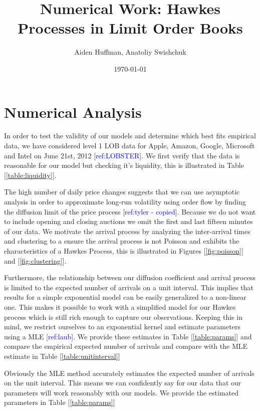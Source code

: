 \documentclass{article}
\title{Numerical Work: Hawkes Processes in Limit Order Books}
\author{Aiden Huffman, Anatoliy Swishchuk}
\date{\today}
\begin{document}
\maketitle

\section*{Numerical Analysis}

In order to test the validity of our models and determine which best fits empirical data, we have considered level 1 LOB data for Apple, Amazon, Google, Microsoft and Intel on June 21st, 2012 [\textcolor{blue}{ref:LOBSTER}]. We first verify that the data is reasonable for our model but checking it's liquidity, this is illustrated in Table [\ref{table:liquidity}].



The high number of daily price changes suggests that we can use asymptotic analysis in order to approximate long-run volatility using order flow by finding the diffusion limit of the price process [\textcolor{blue}{ref:tyler - copied}]. Because we do not want to include opening and closing auctions we omit the first and last fifteen minutes of our data. We motivate the arrival process by analyzing the inter-arrival times and clustering to a ensure the arrival process is not Poisson and exhibits the characteristics of a Hawkes Process, this is illustrated in Figures [\ref{fig:poisson}] and [\ref{fig:clustering}].

Furthermore, the relationship between our diffusion coefficient and arrival process is limited to the expected number of arrivals on a unit interval. This implies that results for a simple exponential model can be easily generalized to a non-linear one. This makes it possible to work with a simplified model for our Hawkes process which is still rich enough to capture our observations. Keeping this in mind, we restrict ourselves to an exponential kernel and estimate parameters using a MLE [\textcolor{blue}{ref:laub}]. We provide these estimates in Table [\ref{table:params}] and compare the empirical expected number of arrivals and compare with the MLE estimate in Table [\ref{table:unitinterval}]



Obviously the MLE method accurately estimates the expected number of arrivals on the unit interval. This means we can confidently say for our data that our parameters will work reasonably with our models. We provide the estimated parameters in Table [\ref{table:params}]
\end{document}
